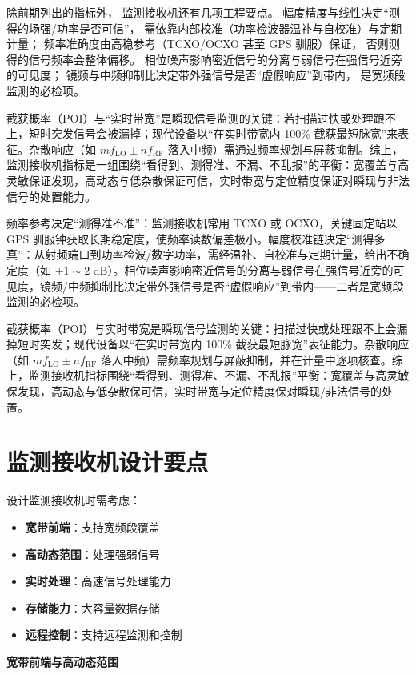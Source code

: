 除前期列出的指标外，
监测接收机还有几项工程要点。
幅度精度与线性决定“测得的场强/功率是否可信”，
需依靠内部校准（功率检波器温补与自校准）与定期计量；
频率准确度由高稳参考（TCXO/OCXO 甚至 GPS 驯服）保证，
否则测得的信号频率会整体偏移。
相位噪声影响密近信号的分离与弱信号在强信号近旁的可见度；
镜频与中频抑制比决定带外强信号是否“虚假响应”到带内，
是宽频段监测的必检项。

截获概率（POI）与“实时带宽”是瞬现信号监测的关键：若扫描过快或处理跟不上，短时突发信号会被漏掉；现代设备以“在实时带宽内 100\% 截获最短脉宽”来表征。杂散响应（如 $m f_{\mathrm{LO}} \pm n f_{\mathrm{RF}}$ 落入中频）需通过频率规划与屏蔽抑制。综上，监测接收机指标是一组围绕“看得到、测得准、不漏、不乱报”的平衡：宽覆盖与高灵敏保证发现，高动态与低杂散保证可信，实时带宽与定位精度保证对瞬现与非法信号的处置能力。

频率参考决定“测得准不准”：监测接收机常用 TCXO 或 OCXO，关键固定站以 GPS 驯服钟获取长期稳定度，使频率读数偏差极小。幅度校准链决定“测得多真”：从射频端口到功率检波/数字功率，需经温补、自校准与定期计量，给出不确定度（如 $\pm1\sim2$ dB）。相位噪声影响密近信号的分离与弱信号在强信号近旁的可见度，镜频/中频抑制比决定带外强信号是否“虚假响应”到带内——二者是宽频段监测的必检项。

截获概率（POI）与实时带宽是瞬现信号监测的关键：扫描过快或处理跟不上会漏掉短时突发；现代设备以“在实时带宽内 100\% 截获最短脉宽”表征能力。杂散响应（如 $m f_{\mathrm{LO}} \pm n f_{\mathrm{RF}}$ 落入中频）需频率规划与屏蔽抑制，并在计量中逐项核查。综上，监测接收机指标围绕“看得到、测得准、不漏、不乱报”平衡：宽覆盖与高灵敏保发现，高动态与低杂散保可信，实时带宽与定位精度保对瞬现/非法信号的处置。

\section{监测接收机设计要点}
\label{sec:monitoring_design}

设计监测接收机时需考虑：

\begin{itemize}
    \item \textbf{宽带前端}：支持宽频段覆盖
    \item \textbf{高动态范围}：处理强弱信号
    \item \textbf{实时处理}：高速信号处理能力
    \item \textbf{存储能力}：大容量数据存储
    \item \textbf{远程控制}：支持远程监测和控制
\end{itemize}

\medskip\noindent\textbf{宽带前端与高动态范围}

